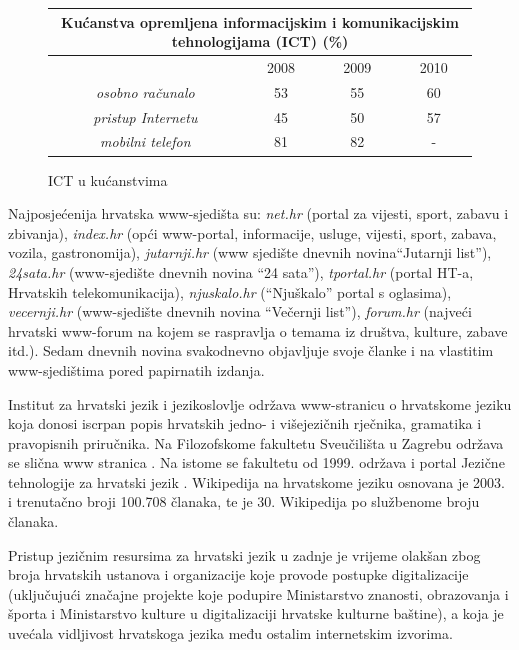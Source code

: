 \begin{multicols}{2}
\begin{figure}[htb]
\centering
	\begin{tabular}{|c|c|c|c|}
        \hline
      \multicolumn{4}{|c|}{\textbf{Kućanstva opremljena informacijskim i komunikacijskim tehnologijama (ICT) (\%)}} \\ \hline
        ~                                              & 2008 & 2009 & 2010 \\ \hline
        \emph{osobno računalo}   & 53   & 55   & 60   \\ \hline
        \emph{pristup Internetu} & 45   & 50   & 57   \\ \hline
        \emph{mobilni telefon}   & 81   & 82   & -    \\
        \hline
   \end{tabular}
  \caption{ICT u kućanstvima}
  \label{fig:IST_kuc}
\end{figure}

Najposjećenija hrvatska www-sjedišta su: \emph{net.hr} (portal za vijesti, sport, zabavu i zbivanja), \emph{index.hr} (opći www-portal, informacije, usluge, vijesti, sport, zabava, vozila, gastronomija), \emph{jutarnji.hr} (www sjedište dnevnih novina“Jutarnji list”), \emph{24sata.hr} (www-sjedište dnevnih novina “24 sata”), \emph{tportal.hr} (portal HT-a, Hrvatskih telekomunikacija), \emph{njuskalo.hr} (“Njuškalo” portal s oglasima), \emph{vecernji.hr} (www-sjedište dnevnih novina “Večernji list”), \emph{forum.hr} (najveći hrvatski www-forum na kojem se raspravlja o temama iz društva, kulture, zabave itd.). Sedam dnevnih novina svakodnevno objavljuje svoje članke i na vlastitim www-sjedištima pored papirnatih izdanja.


Institut za hrvatski jezik i jezikoslovlje održava www-stranicu o hrvatskome jeziku koja donosi iscrpan popis hrvatskih jedno- i višejezičnih rječnika, gramatika i pravopisnih priručnika. Na Filozofskome fakultetu Sveučilišta u Zagrebu održava se slična www stranica \cite{str11}. Na istome se fakultetu od 1999. održava i portal Jezične tehnologije za hrvatski jezik \cite{str12}.
Wikipedija na hrvatskome jeziku osnovana je 2003. i trenutačno broji 100.708 članaka, te je 30. Wikipedija po službenome broju članaka.

Pristup jezičnim resursima za hrvatski jezik u zadnje je vrijeme olakšan zbog broja hrvatskih ustanova i organizacije koje provode postupke digitalizacije (uključujući značajne projekte koje podupire Ministarstvo znanosti, obrazovanja i športa i Ministarstvo kulture u digitalizaciji hrvatske kulturne baštine), a koja je uvećala vidljivost hrvatskoga jezika među ostalim internetskim izvorima.


\end{multicols}

